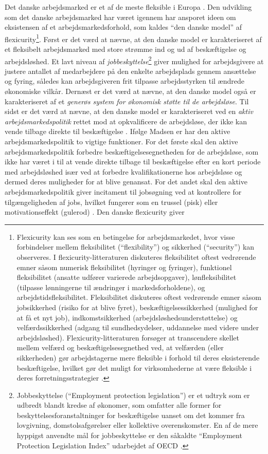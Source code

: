 Det danske arbejdsmarked er et af de meste fleksible i Europa \parencite[722]{Jensen2011} \parencite[140]{Madsen2006} \parencite[4]{Andersen2008}. Den udvikling som det danske arbejdsmarked har været igennem har ansporet ideen om eksistensen af et arbejdsmarkedsforhold, som kaldes “den danske model” af flexicurity\footnote{Flexicurity kan ses som en betingelse for arbejdsmarkedet, hvor visse forbindelser mellem fleksibilitet (“flexibility”) og sikkerhed (“security”) kan observeres. I flexicurity-litteraturen diskuteres fleksibilitet oftest vedrørende emner såsom numerisk fleksibilitet (hyringer og fyringer), funktionel fleksibilitet (ansatte udfører varierede arbejdsopgaver), lønfleksibilitet (tilpasse lønningerne til ændringer i markedsforholdene), og arbejdstidsfleksibilitet. Fleksibilitet diskuteres oftest vedrørende emner såsom jobsikkerhed (risiko for at blive fyret), beskæftigelsessikkerhed (mulighed for at få et nyt job), indkomstsikkerhed (arbejdsløshedsunderstøttelse) og  velfærdssikkerhed (adgang til sundhedsydelser, uddannelse med videre under arbejdsløshed). Flexicurity-litteraturen forsøger at transcendere skellet mellem velfærd og beskæftigelsesegnethed ved, at velfærden (eller sikkerheden) gør arbejdstagerne mere fleksible i forhold til deres eksisterende beskæftigelse, hvilket gør det muligt for virksomhederne at være fleksible i deres forretningsstrategier \parencite[723]{Jensen2011}.}. Først er det værd at nævne, at den danske model er karakteriseret af et fleksibelt arbejdsmarked med store strømme ind og ud af beskæftigelse og arbejdsløshed. Et lavt niveau af \textit{jobbeskyttelse}\footnote{Jobbeskyttelse (“Employment protection legislation”) er et udtryk som er udbredt blandt kredse af økonomer, som omfatter alle former for beskyttelsesforanstaltninger for beskæftigelse uanset om det kommer fra lovgivning, domstolsafgørelser eller kollektive overenskomster. En af de mere hyppigst anvendte mål for jobbeskyttelse er den såkaldte “Employment Protection Legislation Index” udarbejdet af OECD \parencite[50-51]{OECD1999}.} giver mulighed for arbejdsgivere at justere antallet af medarbejdere på den enkelte arbejdsplads gennem ansættelse og fyring, således kan arbejdsgiveren frit tilpasse arbejdsstyrken til ændrede økonomiske vilkår. Dernæst er det værd at nævne, at den danske model også er karakteriseret af et \textit{generøs system for økonomisk støtte til de arbejdsløse}. Til sidst er det værd at nævne, at den danske model er karakteriseret ved en \textit{aktiv arbejdsmarkedspolitik} rettet mod at opkvalificere de arbejdsløse, der ikke kan vende tilbage direkte til beskæftigelse \parencite[140]{Madsen2006}. Ifølge Madsen er har den aktive arbejdsmarkedspolitik to vigtige funktioner. For det første skal den aktive arbejdsmarkedspolitik forbedre beskæftigelsesegnetheden for de arbejdsløse, som ikke har været i til at vende direkte tilbage til beskæftigelse efter en kort periode med arbejdsløshed især ved at forbedre kvalifikationerne hos arbejdsløse og dermed deres muligheder for at blive genansat. For det andet skal den aktive arbejdsmarkedspolitik giver incitament til jobsøgning ved at kontrollere for tilgængeligheden af jobs, hvilket fungerer som en trussel (pisk) eller motivationseffekt (gulerod) \parencite[153]{Madsen2006}. Den danske flexicurity giver 